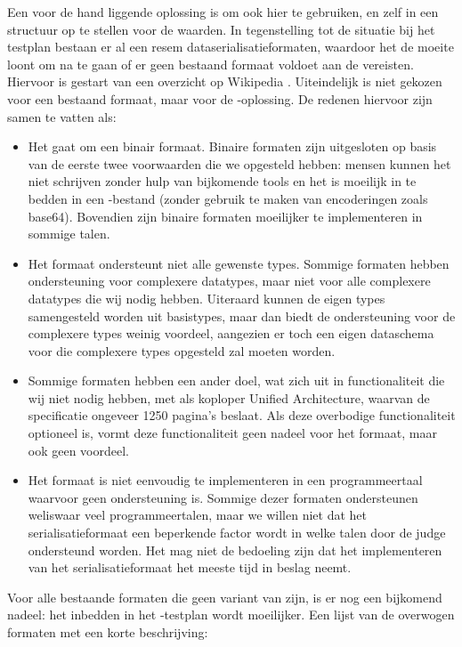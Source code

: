 Een voor de hand liggende oplossing is om ook hier  te gebruiken, en zelf in  een structuur op te stellen voor de waarden.
In tegenstelling tot de situatie bij het testplan bestaan er al een resem dataserialisatieformaten, waardoor het de moeite loont om na te gaan of er geen bestaand formaat voldoet aan de vereisten.
Hiervoor is gestart van een overzicht op Wikipedia \autocite{wiki2020}.
Uiteindelijk is niet gekozen voor een bestaand formaat, maar voor de -oplossing.
De redenen hiervoor zijn samen te vatten als:

\begin{itemize}
    \item Het gaat om een binair formaat.
    Binaire formaten zijn uitgesloten op basis van de eerste twee voorwaarden die we opgesteld hebben: mensen kunnen het niet schrijven zonder hulp van bijkomende tools en het is moeilijk in te bedden in een -bestand (zonder gebruik te maken van encoderingen zoals base64).
    Bovendien zijn binaire formaten moeilijker te implementeren in sommige talen.
    \item Het formaat ondersteunt niet alle gewenste types.
    Sommige formaten hebben ondersteuning voor complexere datatypes, maar niet voor alle complexere datatypes die wij nodig hebben.
    Uiteraard kunnen de eigen types samengesteld worden uit basistypes, maar dan biedt de ondersteuning voor de complexere types weinig voordeel, aangezien er toch een eigen dataschema voor die complexere types opgesteld zal moeten worden.
    \item Sommige formaten hebben een ander doel, wat zich uit in functionaliteit die wij niet nodig hebben, met als koploper  Unified Architecture, waarvan de specificatie ongeveer 1250 pagina's beslaat.
    Als deze overbodige functionaliteit optioneel is, vormt deze functionaliteit geen nadeel voor het formaat, maar ook geen voordeel.
    \item Het formaat is niet eenvoudig te implementeren in een programmeertaal waarvoor geen ondersteuning is.
    Sommige dezer formaten ondersteunen weliswaar veel programmeertalen, maar we willen niet dat het serialisatieformaat een beperkende factor wordt in welke talen door de judge ondersteund worden.
    Het mag niet de bedoeling zijn dat het implementeren van het serialisatieformaat het meeste tijd in beslag neemt.
\end{itemize}

Voor alle bestaande formaten die geen variant van  zijn, is er nog een bijkomend nadeel: het inbedden in het -testplan wordt moeilijker.
Een lijst van de overwogen formaten met een korte beschrijving:

